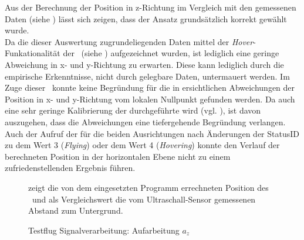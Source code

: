 \FloatBarrier
{}


Aus der Berechnung der Position in z-Richtung im Vergleich mit den gemessenen Daten (siehe ) lässt sich zeigen, dass der Ansatz grundsätzlich korrekt gewählt wurde.\\
Da die dieser Auswertung zugrundeliegenden Daten mittel der \textit{Hover}-Funkationalität der \Ar\ (siehe ) aufgezeichnet wurden, ist lediglich eine geringe Abweichung in x- und y-Richtung zu erwarten. Diese kann lediglich durch die empirische Erkenntnisse, nicht durch gelegbare Daten, untermauert werden.
Im Zuge dieser \Arbeit\ konnte keine Begründung für die in  ersichtlichen Abweichungen der Position in x- und y-Richtung vom lokalen Nullpunkt gefunden werden. Da auch eine sehr geringe Kalibrierung der  durchgeführte wird (vgl. ), ist davon auszugehen, dass die Abweichungen eine tiefergehende Begründung verlangen. Auch der Aufruf der  für die beiden Ausrichtungen nach Änderungen der StatusID zu dem Wert 3 (\textit{Flying}) oder dem Wert 4 (\textit{Hovering}) konnte den Verlauf der berechneten Position in der horizontalen Ebene nicht zu einem zufriedenstellenden Ergebnis führen.

\begin{figure}[ht!]
\vspace{0.25cm}
\begin{center}
\caption{Testflug Signalverarbeitung: Aufarbeitung $a_z$}
\label{fig:FlightPos}
\end{center}

\vspace{0.25cm}
 zeigt die von dem eingesetzten Programm errechneten Position des \Quad[s] \Ar\ und als Vergleichswert die vom Ultraschall-Sensor gemessenen Abstand zum Untergrund.
\end{figure}

















